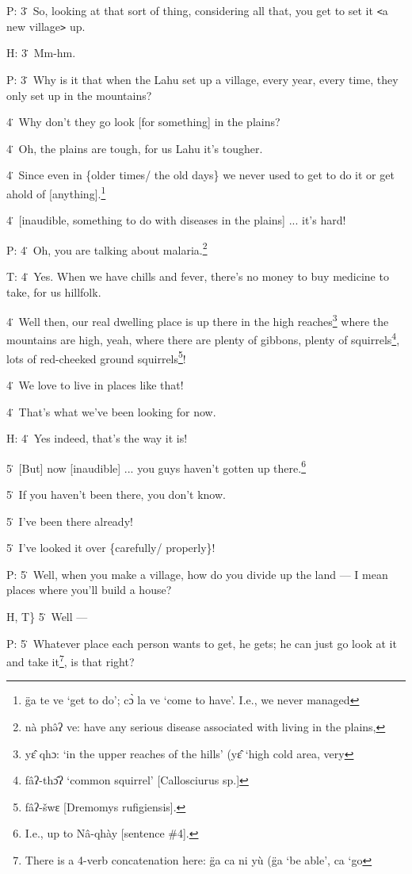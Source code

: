P: 3\. So, looking at that sort of thing, considering all that, you get to set
it \texttt{<}a new village\texttt{>} up.

H: 3\. Mm-hm.

P: 3\. Why is it that when the Lahu set up a village, every year, every time, they
only set up in the mountains?

4\. Why don't they go look [for something] in the plains?

4\. Oh, the plains are tough, for us Lahu it's tougher.

4\. Since even in \{older times/ the old days\} we never used to get to do it or
get ahold of [anything].\footnote{g̈a te ve `get to do'; cɔ̀ la ve `come to have'. I.e., we never managed}

4\. [inaudible, something to do with diseases in the plains] ... it's hard!

P: 4\. Oh, you are talking about malaria.\footnote{nà phə̂ʔ ve: have any serious disease associated with living in the plains,}

T: 4\. Yes. When we have chills and fever, there's no money to buy medicine to
take, for us hillfolk.

4\. Well then, our real dwelling place is up there in the high reaches\footnote{yɛ̂ qhɔ: `in the upper reaches of the hills' (yɛ̂ `high cold area, very} where
the mountains are high, yeah, where there are plenty of gibbons, plenty of squirrels\footnote{fâʔ-thɔ̂ʔ `common squirrel' [Callosciurus sp.]},
lots of red-cheeked ground squirrels\footnote{fâʔ-šwɛ [Dremomys rufigiensis].}!

4\. We love to live in places like that!

4\. That's what we've been looking for now.

H: 4\. Yes indeed, that's the way it is!

5\. [But] now [inaudible] ... you guys haven't gotten up there.\footnote{I.e., up to Nâ-qhày [sentence \#4].}

5\. If you haven't been there, you don't know.

5\. I've been there already!

5\. I've looked it over \{carefully/ properly\}!

P: 5\. Well, when you make a village, how do you divide up the land --- I mean
places where you'll build a house?

H, T\} 5\. Well ---

P: 5\. Whatever place each person wants to get, he gets; he can just go look at
it and take it\footnote{There is a 4-verb concatenation here: g̈a ca ni yù (g̈a `be able', ca `go}, is that right?

